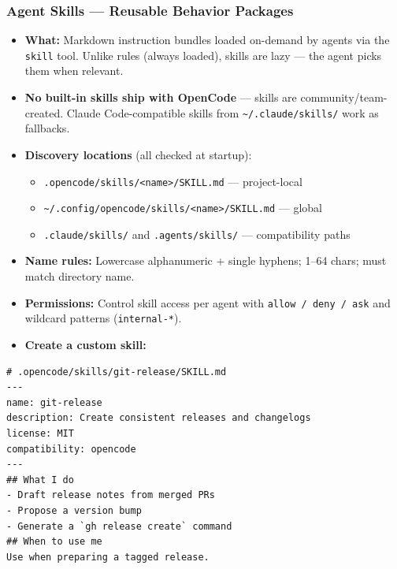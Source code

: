 \begin{frame}[fragile]\frametitle{Agent Skills — Reusable Behavior Packages}
  \begin{itemize}
    \item \textbf{What:} Markdown instruction bundles loaded on-demand by agents via the \texttt{skill} tool. Unlike rules (always loaded), skills are lazy — the agent picks them when relevant.
    \item \textbf{No built-in skills ship with OpenCode} — skills are community/team-created. Claude Code-compatible skills from \texttt{\textasciitilde/.claude/skills/} work as fallbacks.
    \item \textbf{Discovery locations} (all checked at startup):
      \begin{itemize}
        \item \texttt{.opencode/skills/<name>/SKILL.md} — project-local
        \item \texttt{\textasciitilde/.config/opencode/skills/<name>/SKILL.md} — global
        \item \texttt{.claude/skills/} and \texttt{.agents/skills/} — compatibility paths
      \end{itemize}
    \item \textbf{Name rules:} Lowercase alphanumeric + single hyphens; 1–64 chars; must match directory name.
    \item \textbf{Permissions:} Control skill access per agent with \texttt{allow / deny / ask} and wildcard patterns (\texttt{internal-*}).
  
    \item \textbf{Create a custom skill:}
  \end{itemize}		
\begin{lstlisting}
# .opencode/skills/git-release/SKILL.md
---
name: git-release
description: Create consistent releases and changelogs
license: MIT
compatibility: opencode
---
## What I do
- Draft release notes from merged PRs
- Propose a version bump
- Generate a `gh release create` command
## When to use me
Use when preparing a tagged release.
\end{lstlisting}

\end{frame}

